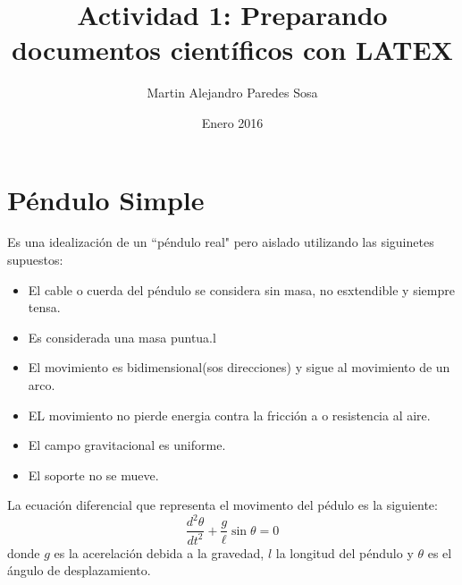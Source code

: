 \documentclass[12pt]{article}
\begin{document}
\title{Actividad 1: Preparando documentos científicos con LATEX}
\author{Martin Alejandro Paredes Sosa}
\date{Enero 2016}
\maketitle

\section{Péndulo Simple}
Es una idealización de un ``péndulo real" pero aislado utilizando las siguinetes supuestos:
\begin{itemize}
\item El cable o cuerda del péndulo se considera sin masa, no esxtendible y siempre tensa.
\item Es considerada una masa puntua.l %
\item El movimiento es bidimensional(sos direcciones) y sigue al movimiento de un arco.
\item EL movimiento no pierde energia contra la fricción a o resistencia al aire.
\item El campo gravitacional es uniforme.
\item El soporte no se mueve.
\end{itemize}

La ecuación diferencial que representa el movimento del pédulo es la siguiente:
\begin{equation}
\frac{d^2\theta}{dt^2}+\frac{g}{\ell}\sin\theta=0
\end{equation}
donde $g$ es la acerelación debida a la gravedad, $l$ la longitud del péndulo y $\theta$ es el ángulo de desplazamiento.

\end{document}
